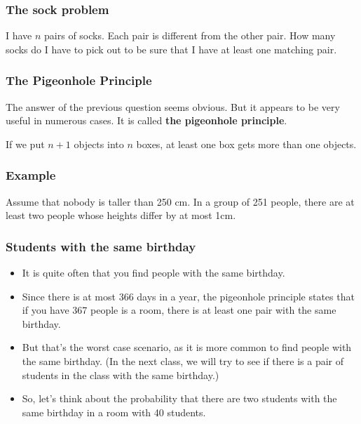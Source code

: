 

\begin{frame}\frametitle{The sock problem}
  \begin{tcolorbox}
    I have $n$ pairs of socks.  Each pair is different from the other
    pair.  How many socks do I have to pick out to be sure that I have
    at least one matching pair.
  \end{tcolorbox}
  \vspace{2in}
\end{frame}

\begin{frame}\frametitle{The Pigeonhole Principle}
  The answer of the previous question seems obvious.  But it appears
  to be very useful in numerous cases.  It is called {\bf the
    pigeonhole principle}.

  \begin{tcolorbox}[title=The pigeonhole principle]
    If we put $n+1$ objects into $n$ boxes, at least one box gets more
    than one objects.
  \end{tcolorbox}
\end{frame}

\begin{frame}\frametitle{Example}
  \begin{tcolorbox}
    Assume that nobody is taller than 250 cm.  In a group of 251
    people, there are at least two people whose heights differ by at
    most 1cm.
  \end{tcolorbox}
  \vspace{2in}
\end{frame}

\begin{frame}\frametitle{Students with the same birthday}
  \begin{itemize}
  \item It is quite often that you find people with the same birthday.
  \item Since there is at most 366 days in a year, the pigeonhole
    principle states that if you have 367 people is a room, there is
    at least one pair with the same birthday.
    \pause
  \item But that's the worst case scenario, as it is more common to
    find people with the same birthday.  (In the next class, we will
    try to see if there is a pair of students in the class with the
    same birthday.)
    \pause
  \item So, let's think about the probability that there are two
    students with the same birthday in a room with 40 students.
  \end{itemize}
\end{frame}

